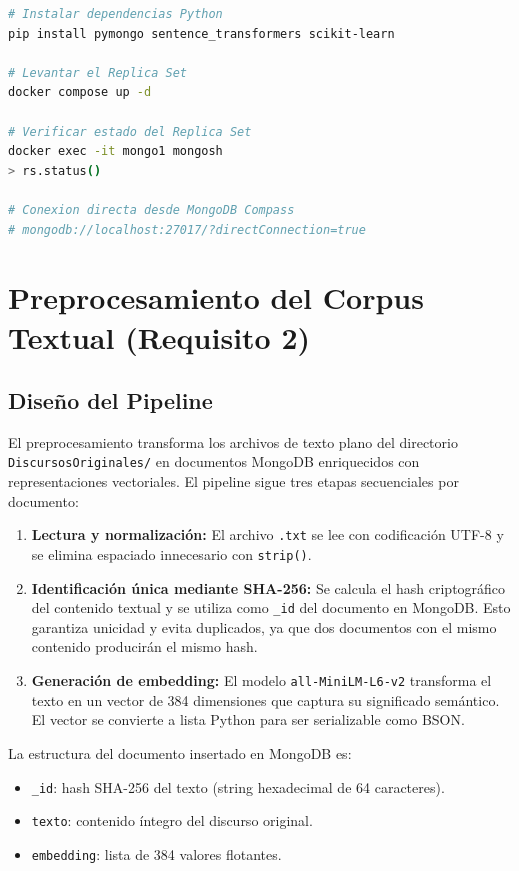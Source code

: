 \documentclass[12pt,a4paper]{article}
\begin{document}
\begin{lstlisting}[language=bash, caption={Comandos de gestión del clúster}]
# Instalar dependencias Python
pip install pymongo sentence_transformers scikit-learn

# Levantar el Replica Set
docker compose up -d

# Verificar estado del Replica Set
docker exec -it mongo1 mongosh
> rs.status()

# Conexion directa desde MongoDB Compass
# mongodb://localhost:27017/?directConnection=true
\end{lstlisting}

\section{Preprocesamiento del Corpus Textual (Requisito 2)}

\subsection{Diseño del Pipeline}

El preprocesamiento transforma los archivos de texto plano del directorio \texttt{DiscursosOriginales/} en documentos MongoDB enriquecidos con representaciones vectoriales. El pipeline sigue tres etapas secuenciales por documento:

\begin{enumerate}
    \item \textbf{Lectura y normalización:} El archivo \texttt{.txt} se lee con codificación UTF-8 y se elimina espaciado innecesario con \texttt{strip()}.
    \item \textbf{Identificación única mediante SHA-256:} Se calcula el hash criptográfico del contenido textual y se utiliza como \texttt{\_id} del documento en MongoDB. Esto garantiza unicidad y evita duplicados, ya que dos documentos con el mismo contenido producirán el mismo hash.
    \item \textbf{Generación de embedding:} El modelo \texttt{all-MiniLM-L6-v2} transforma el texto en un vector de 384 dimensiones que captura su significado semántico. El vector se convierte a lista Python para ser serializable como BSON.
\end{enumerate}

La estructura del documento insertado en MongoDB es:
\begin{itemize}
    \item \texttt{\_id}: hash SHA-256 del texto (string hexadecimal de 64 caracteres).
    \item \texttt{texto}: contenido íntegro del discurso original.
    \item \texttt{embedding}: lista de 384 valores flotantes.
\end{itemize}
\end{document}
